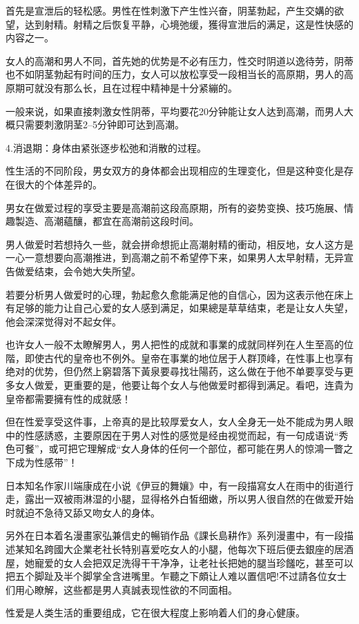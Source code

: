\documentclass[12pt,UTF8]{ctexbook}
\begin{document}
首先是宣泄后的轻松感。男性在性刺激下产生性兴奋，阴茎勃起，产生交媾的欲望，达到射精。射精之后恢复平静，心境弛缓，獲得宣泄后的满足，这是性快感的内容之一。

女人的高潮和男人不同，首先她的优势是不必有压力，性交时阴道以逸待劳，阴蒂也不如阴茎勃起有时间的压力，女人可以放松享受一段相当长的高原期，男人的高原期可就没有那么长，且在过程中精神是十分紧繃的。

一般来说，如果直接刺激女性阴蒂，平均要花20分钟能让女人达到高潮，而男人大概只需要刺激阴茎2--5分钟即可达到高潮。

4.消退期：身体由紧张逐步松弛和消散的过程。

性生活的不同阶段，男女双方的身体都会出现相应的生理变化，但是这种变化是存在很大的个体差异的。

男女在做爱过程的享受主要是高潮前这段高原期，所有的姿势变换、技巧施展、情趣製造、高潮蘊釀，都宜在高潮前这段时间。

男人做爱时若想持久一些，就会拼命想扼止高潮射精的衝动，相反地，女人这方是一心一意想要向高潮推进，到高潮之前不希望停下来，如果男人太早射精，无异宣告做爱结束，会令她大失所望。

若要分析男人做爱时的心理，勃起愈久愈能满足他的自信心，因为这表示他在床上有足够的能力让自己心爱的女人感到满足，如果總是草草结束，老是让女人失望，他会深深觉得对不起女伴。

也许女人一般不太瞭解男人，男人把性的成就和事業的成就同样列在人生至高的位階，即使古代的皇帝也不例外。皇帝在事業的地位居于人群顶峰，在性事上也享有绝对的优势，但仍然上窮碧落下黃泉要尋找壮陽药，这么做在于他不单要享受与更多女人做爱，更重要的是，他要让每个女人与他做爱时都得到满足。看吧，连貴为皇帝都需要擁有性的成就感！

但在性爱享受这件事，上帝真的是比较厚爱女人，女人全身无一处不能成为男人眼中的性感誘惑，主要原因在于男人对性的感觉是经由视觉而起，有一句成语说“秀色可餐”，或可把它理解成“女人身体的任何一个部位，都可能在男人的惊鴻一瞥之下成为性感带”！

日本知名作家川端康成在小说《伊豆的舞孃》中，有一段描寫女人在雨中的街道行走，露出一双被雨淋湿的小腿，显得格外白皙细嫩，所以男人很自然的在做爱开始时就迫不急待又舔又吻女人的身体。

另外在日本着名漫畫家弘兼信史的暢销作品《課长島耕作》系列漫畫中，有一段描述某知名跨國大企業老社长特别喜爱吃女人的小腿，他每次下班后便去銀座的居酒屋，她寵爱的女人会把双足洗得干干净净，让老社长把她的腿当珍饈吃，甚至可以把五个脚趾及半个脚掌全含进嘴里。乍聽之下頗让人难以置信吧!不过請各位女士们用心瞭解，这些都是男人真誠表现性欲的不同面相。

性爱是人类生活的重要组成，它在很大程度上影响着人们的身心健康。
\end{document}
